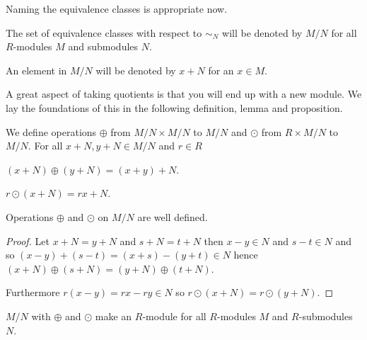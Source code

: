 Naming the equivalence classes is appropriate now.

\begin{definition}
	The set of equivalence classes with respect to $\sim_{N}$ will be
	denoted by $M/N$ for all $R$-modules $M$ and submodules $N$.
	
	An element in $M/N$ will be denoted by $x+N$ for an $x\in M$.
\end{definition}

A great aspect of taking quotients is that you will end up with a new module. We
lay the foundations of this in the following definition, lemma and proposition.

\begin{definition}
	We define operations $\oplus$ from $M/N \times M/N$ to $M/N$ and $\odot$
	from $R\times M/N$ to $M/N$. For all $x+N,y+N\in M/N$ and $r\in R$
	\begin{definitionlist}[Q]
		\item $(x+N) \oplus (y+N) = (x+y) + N$.
		
		\item $r\odot(x+N) = rx + N$.
	\end{definitionlist}
\end{definition}

\begin{lemma}
	Operations $\oplus$ and $\odot$ on $M/N$ are well defined.
\end{lemma}

\begin{proof}
	Let $x+N = y+N$ and $s+N = t+N$ then $x-y\in N$ and $s-t\in N$ and so
	$(x-y) + (s-t) = (x+s) - (y+t) \in N$ hence $(x+N) \oplus (s+N) = (y+N)
	\oplus (t+N)$.
	
	Furthermore $r(x-y)=rx - ry\in N$ so $r\odot(x+N) = r\odot(y+N)$.
\end{proof}

\begin{proposition}
	$M/N$ with $\oplus$ and $\odot$ make an $R$-module for all $R$-modules
	$M$ and $R$-submodules $N$.
\end{proposition}

